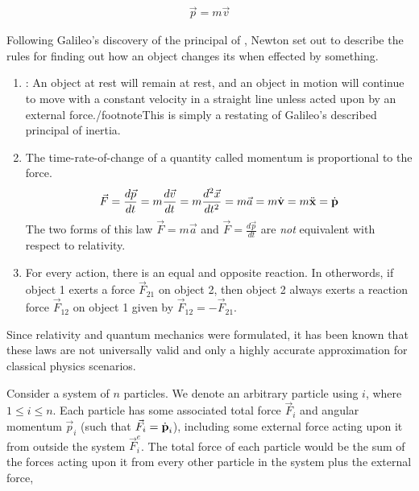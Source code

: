 \begin{align}
	\vec{p} = m\vec{v}
\end{align}

Following Galileo's discovery of the principal of , Newton set out to describe the rules for finding out how an object changes its  when effected by something.

\begin{fancybox}{1}
	\begin{enumerate}
		\item {}: An object at rest will remain at rest, and an object in motion will continue to move with a constant velocity in a straight line unless acted upon by an external force./footnote{This is simply a restating of Galileo's described principal of inertia.}
		\item The time-rate-of-change of a quantity called momentum is proportional to the force.
		\begin{align}
			\vec{F}=\frac{d\vec{p}}{dt} = m\frac{d\vec{v}}{dt} = m\frac{d^2\vec{x}}{dt^2} = m\vec{a} = m\dot{\text{\textbf{v}}} = m\ddot{\text{\textbf{x}}} = \dot{\text{\textbf{p}}} \label{Newton's Second Law}
		\end{align}
		The two forms of this law $\vec{F}=m\vec{a}$ and $\vec{F}=\frac{d\vec{p}}{dt}$ are \textit{not} equivalent with respect to relativity.
		\item For every action, there is an equal and opposite reaction. In otherwords, if object 1 exerts a force $\vec{F}_{21}$ on object 2, then object 2 always exerts a reaction force $\vec{F}_{12}$ on object 1 given by $\vec{F}_{12}=-\vec{F}_{21}$.
	\end{enumerate}
\end{fancybox}

\begin{interestnote}
Since relativity and quantum mechanics were formulated, it has been known that these laws are not universally valid and only a highly accurate approximation for classical physics scenarios.
\end{interestnote}

Consider a system of $n$ particles. We denote an arbitrary particle using $i$, where $1\leq i \leq n$. Each particle has some associated total force $\vec{F}_i$ and angular momentum $\vec{p}_i$ (such that $\vec{F}_i = \dot{\text{\textbf{p}}}_i$), including some external force acting upon it from outside the system $\vec{F}_i^e$. The total force of each particle would be the sum of the forces acting upon it from every other particle in the system plus the external force,

